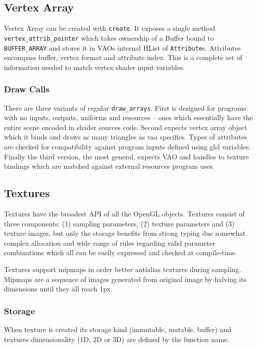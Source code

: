 \subsection{Vertex Array}

Vertex Array can be created with \texttt{create}.
It exposes a single method \texttt{vertex\_attrib\_pointer} which takes ownership of a Buffer bound to \texttt{BUFFER\_ARRAY}
and stores it in VAOs internal HList of \texttt{Attribute}s.
Attributes encompass buffer, vertex format and attribute index. This is a complete set of information needed to match vertex shader input variables.

\subsubsection{Draw Calls}

There are three variants of regular \texttt{draw\_arrays}. First is designed for programs with no inputs, outputs, uniforms and resources -- ones which essentially have the entire scene
encoded in shader sources code. 
Second expects vertex array object which it binds and draws as many triangles as vao specifies. Types of attributes are checked for compatibility against program inputs defined using glsl variables.
Finally the third version, the most general, expects VAO and handles to texture bindings which are matched against external resources program uses. 

\subsection{Textures}

Textures have the broadest API of all the OpenGL objects.
Textures consist of three components: (1) sampling parameters, (2) texture parameters and (3) texture images, but only the storage benefits 
from strong typing due somewhat complex allocation and wide range of rules regarding valid parameter combinations which all can be easily expressed and checked at compile-time.

Textures support mipmaps in order better antialias textures during sampling. Mipmaps are a sequence of images generated from original image by halving its dimensions until they all reach 1px.

\subsubsection{Storage}

When texture is created its storage kind (immutable, mutable, buffer) and textures dimensionality (1D, 2D or 3D) are defined by the function name.


